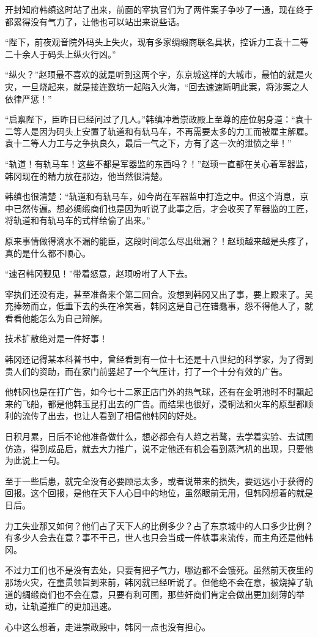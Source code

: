 开封知府韩缜这时站了出来，前面的宰执官们为了两件案子争吵了一通，现在终于都累得没有气力了，让他也可以站出来说些话。

“陛下，前夜观音院外码头上失火，现有多家绸缎商联名具状，控诉力工袁十二等二十余人于码头上纵火行凶。”

“纵火？”赵顼最不喜欢的就是听到这两个字，东京城这样的大城市，最怕的就是火灾，一旦烧起来，就是接连数坊一起陷入火海，“回去速速断明此案，将涉案之人依律严惩！”

“启禀陛下，臣昨日已经问过了几人。”韩缜冲着崇政殿上至尊的座位躬身道：“袁十二等人是因为码头上安置了轨道和有轨马车，不再需要太多的力工而被雇主解雇。袁十二等人力工与之争执良久，最后一气之下，方有了这一次的泄愤之举！”

“轨道！有轨马车！这些不都是军器监的东西吗？！”赵顼一直都在关心着军器监，韩冈现在的精力放在那边，他当然很清楚。

韩缜也很清楚：“轨道和有轨马车，如今尚在军器监中打造之中。但这个消息，京中已然传遍。想必绸缎商们也是因为听说了此事之后，才会收买了军器监的工匠，将轨道和有轨马车的式样给偷了出来。”

原来事情做得滴水不漏的能臣，这段时间怎么尽出纰漏？！赵顼越来越是头疼了，真的是什么都不顺心。

“速召韩冈觐见！”带着怒意，赵顼吩咐了人下去。

宰执们还没有走，甚至准备来个第二回合。没想到韩冈又出了事，要上殿来了。吴充捧笏而立，低垂下去的头在冷笑着，韩冈这是自己在错蠢事，怨不得他人了，就看看他能怎么为自己辩解。

技术扩散绝对是一件好事！

韩冈还记得某本科普书中，曾经看到有一位十七还是十八世纪的科学家，为了得到贵人们的资助，而在家门前竖起了一个气压计，打了一个十分有效的广告。

他韩冈也是在打广告，如今七十二家正店门外的热气球，还有在金明池时不时飘起来的飞船，都是他韩玉昆打出去的广告。而结果也很好，浸铜法和火车的原型都顺利的流传了出去，也让人看到了相信他韩冈的好处。

日积月累，日后不论他准备做什么，想必都会有人趋之若鹜，去学着实验、去试图仿造，得到成品后，就去大力推广，说不定他还有机会看到蒸汽机的出现，只要他为此说上一句。

至于一些后患，就完全没有必要顾忌太多，或者说带来的损失，要远远小于获得的回报。这个回报，是他在天下人心目中的地位，虽然眼前无用，但韩冈想着的就是日后。

力工失业那又如何？他们占了天下人的比例多少？占了东京城中的人口多少比例？有多少人会去在意？事不干己，世人也只会当成一件轶事来流传，而主角还是他韩冈。

不过力工们也不是没有去处，只要有把子气力，哪边都不会饿死。虽然前天夜里的那场火灾，在童贯领旨到来前，韩冈就已经听说了。但他绝不会在意，被烧掉了轨道的绸缎商们也不会在意，只要有利可图，那些奸商们肯定会做出更加刻薄的举动，让轨道推广的更加迅速。

心中这么想着，走进崇政殿中，韩冈一点也没有担心。

